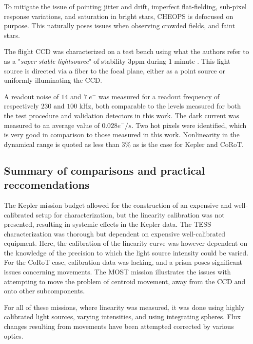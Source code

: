 \documentclass[../main.tex]{subfiles}
\begin{document}
To mitigate the issue of pointing jitter and drift, imperfect flat-fielding, sub-pixel response variations, and saturation in bright stars, CHEOPS is defocused on purpose. This naturally poses issues when observing crowded fields, and faint stars.

The flight CCD was characterized on a test bench using what the authors refer to as a "\textit{super stable lightsource}" of stability $3$ppm during $1$ minute \cite{cheopschar}. This light source is directed via a fiber to the focal plane, either as a point source or uniformly illuminating the CCD.

A readout noise of $14$ and $7 \; e^-$ was measured for a readout frequency of respectively $230$ and $100$ kHz\cite{cheopschar}, both comparable to the levels measured for both the test procedure and validation detectors in this work. The dark current was measured to an average value of $0.028 e^-/s$\cite{cheopschar}. Two hot pixels were identified, which is very good in comparison to those measured in this work. Nonlinearity in the dynamical range is quoted as less than $3\%$ as is the case for Kepler and CoRoT.

\subsection{Summary of comparisons and practical reccomendations}
The Kepler mission budget allowed for the construction of an expensive and well-calibrated setup for characterization, but the linearity calibration was not presented, resulting in systemic effects in the Kepler data. The TESS characterization was thorough but dependent on expensive well-calibrated equipment. Here, the calibration of the linearity curve was however dependent on the knowledge of the precision to which the light source intensity could be varied. For the CoRoT case, calibration data was lacking, and a prism poses significant issues concerning movements. The MOST mission illustrates the issues with attempting to move the problem of centroid movement, away from the CCD and onto other subcomponents. 

For all of these missions, where linearity was measured, it was done using highly calibrated light sources, varying intensities, and using integrating spheres. Flux changes resulting from movements have been attempted corrected by various optics. 
\end{document}
